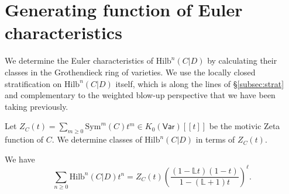 \documentclass[10.5pt]{amsart}
\theoremstyle{definition}
\newenvironment{customthm}[1]
  {\renewcommand\theinnercustomthm{#1}\innercustomthm}
  {\endinnercustomthm}
\theoremstyle{definition}
\theoremstyle{definition}
\theoremstyle{definition}
\newcommand{\Hilb}{\mathrm{Hilb}}
\begin{document}


\section{Generating function of Euler characteristics}\label{sec:chi}
We determine the Euler characteristics of $\Hilb^n(C|D)$ by calculating their classes in the Grothendieck ring of varieties. We use the locally closed stratification on $\mathrm{Hilb}^n(C|D)$ itself, which is along the lines of §\ref{subsec:strat} and complementary to the weighted blow-up perspective that we have been taking previously.

Let $Z_C(t)= \sum_{m\geq 0} \mathrm{Sym}^m(C) t^m\in K_0(\mathsf{Var})[\![t]\!]$ be the motivic Zeta function of $C.$ We determine classes of $\Hilb^n(C|D)$ in terms of $Z_C(t).$

\begin{customthm}{E}\label{thm:chi}
     We have $$\sum_{n\geq 0}\Hilb^n(C|D) t^n = Z_C(t)\left(\frac{(1-\mathbb{L}t)(1-t)}{1-(\mathbb{L}+1)t}\right)^\ell.$$
\end{customthm}
\end{document}
